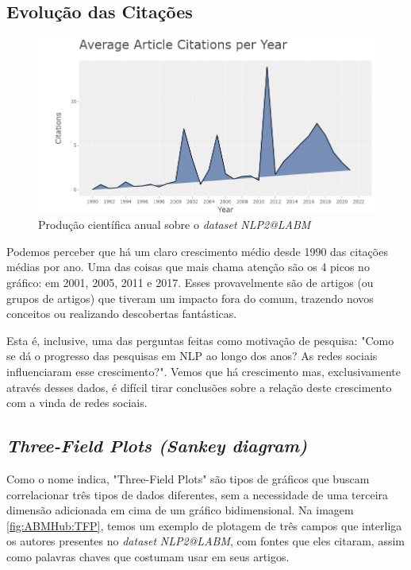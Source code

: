 \subsection{Evolução das Citações}

 \begin{figure}
    \centering
    \includegraphics[width=1\textwidth]{experiments/ABMHub/PesquisaBibliometrica/NLP/citationsPerYear.png}
    \caption{Produção científica anual sobre o \textit{dataset} \textit{NLP2@LABM}}
    \label{fig:ABMHub:CPY}
\end{figure}

Podemos perceber que há um claro crescimento médio desde 1990 das citações médias por ano. Uma das coisas que mais chama atenção são os 4 picos no gráfico: em 2001, 2005, 2011 e 2017. Esses provavelmente são de artigos (ou grupos de artigos) que tiveram um impacto fora do comum, trazendo novos conceitos ou realizando descobertas fantásticas.

Esta é, inclusive, uma das perguntas feitas como motivação de pesquisa: "Como se dá o progresso das pesquisas em NLP ao longo dos anos? As redes sociais influenciaram esse crescimento?". Vemos que há crescimento mas, exclusivamente através desses dados, é difícil tirar conclusões sobre a relação deste crescimento com a vinda de redes sociais. 

\subsection{\textit{Three-Field Plots (Sankey diagram)}}

Como o nome indica, "Three-Field Plots" são tipos de gráficos que buscam correlacionar três tipos de dados diferentes, sem a necessidade de uma terceira dimensão adicionada em cima de um gráfico bidimensional. Na imagem \ref{fig:ABMHub:TFP}, temos um exemplo de plotagem de três campos que interliga os autores presentes no \textit{dataset} \textit{NLP2@LABM}, com fontes que eles citaram, assim como palavras chaves que costumam usar em seus artigos. 

